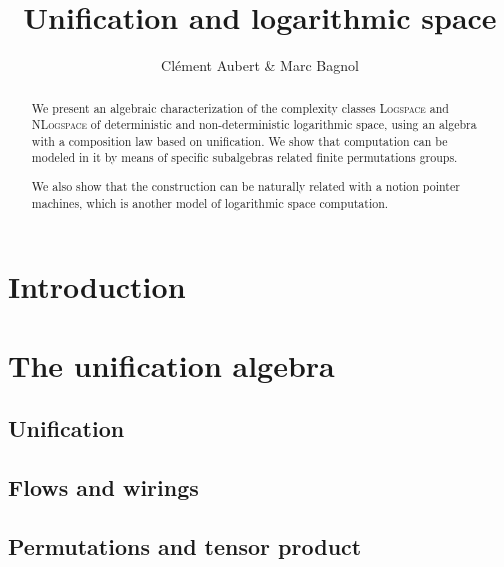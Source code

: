 

\title{Unification and logarithmic space}
\author{Clément Aubert \& Marc Bagnol}

\maketitle







\begin{abstract}
	We present an algebraic characterization of the complexity classes \textsc{Logspace} and \textsc{NLogspace} of deterministic and non-deterministic logarithmic space, using an algebra with a composition law based on unification. We show that computation can be modeled in it by means of specific subalgebras related finite permutations groups.

We also show that the construction can be naturally related with a notion pointer machines, which is another model of logarithmic space computation.
\end{abstract}


\section{Introduction}


\section{The unification algebra}\label{sec:unification}
	\subsection{Unification}
	
	\subsection{Flows and wirings}
	
	\subsection{Permutations and tensor product}\label{permutation}
	


